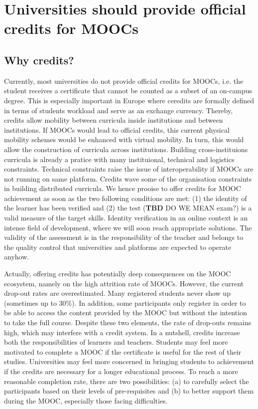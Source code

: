 \section{Universities should provide official credits for MOOCs}
\label{sec:credit}
 
\subsection{Why credits?}

Currently, most universities do not provide official credits for MOOCs,
i.e. the student receives a certificate that cannot be counted as a
subset of an on-campus degree. This is especially important in Europe where
ceredits are formally defined in terms of students workload and serve as
an exchange currency. Thereby, credits allow mobility between curricula inside
institutions and between institutions. If MOOCs would lead to official
credits, this current physical mobility schemes would be enhanced with 
virtual mobility. In turn, this would allow the construction of curricula
across institutions. Building cross-instituions curricula is already a
pratice with many instituional, technical and logistics constraints. 
Technical constraints raise the issue of interoperability if MOOCs are not
running on same platform. Credits wave some of the organisation constraints
in building distributed curricula. We hence prooise to offer  credits for 
MOOC achievement as soon as the two following conditions are met: (1) the identity of the
learner has been verified and (2) the test (\textbf{TBD} DO WE MEAN exam?) is a valid
measure of the target skills. Identity verification in an online context
is an intense field of development, where we will soon reach appropriate
solutions. The validity of the assessment is in the responsibility of
the teacher and belongs to the quality control that universities and
platforms are expected to operate anyhow.

Actually, offering credits has potentially deep consequences on the MOOC
ecosystem, namely on the high attrition rate of MOOCs. However, the
current drop-out rates are overestimated. Many registered students never
show up (sometimes up to 30\%). In addition, some participants only
register in order to be able to access the content provided by the MOOC
but without the intention to take the full course. Despite these two
elements, the rate of drop-outs remains high, which may interfere with a
credit system. In a nutshell, credits increase both the responsibilities
of learners and teachers. Students may feel more motivated to complete a
MOOC if the certificate is useful for the rest of their
studies. Universities may feel more concerned in bringing students to
achievement if the credits are necessary for a longer educational
process.  To reach a more reasonable completion rate, there are two
possibilities: (a) to carefully select the participants based on their
levels of pre-requisites and (b) to better support them during the MOOC,
especially those facing difficulties.


